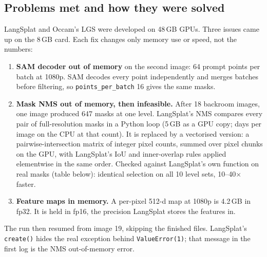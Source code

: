 \documentclass[11pt,a4paper]{article}
\newcommand{\code}[1]{\texttt{\small #1}}
\begin{document}
\subsection{Problems met and how they were solved}
LangSplat and Occam's LGS were developed on 48\,GB GPUs. Three issues came up on the 8\,GB card. Each fix changes only
memory use or speed, not the numbers:
\begin{enumerate}[leftmargin=*,itemsep=2pt]
  \item \textbf{SAM decoder out of memory} on the second image: 64 prompt points per batch at 1080p. SAM decodes every
        point independently and merges batches before filtering, so \code{points\_per\_batch} 16 gives the same masks.
  \item \textbf{Mask NMS out of memory, then infeasible.} After 18 backroom images, one image produced 647 masks at one
        level. LangSplat's NMS compares every pair of full-resolution masks in a Python loop (5\,GB as a GPU copy; days
        per image on the CPU at that count). It is replaced by a vectorised version: a pairwise-intersection matrix of
        integer pixel counts, summed over pixel chunks on the GPU, with LangSplat's IoU and inner-overlap rules applied
        elementwise in the same order. Checked against LangSplat's own function on real masks (table below): identical
        selection on all 10 level sets, 10--40$\times$ faster.
  \item \textbf{Feature maps in memory.} A per-pixel 512-d map at 1080p is 4.2\,GB in fp32. It is held in fp16, the
        precision LangSplat stores the features in.
\end{enumerate}
The run then resumed from image 19, skipping the finished files. LangSplat's \code{create()} hides the real exception
behind \code{ValueError(1)}; that message in the first log is the NMS out-of-memory error.

\begin{center}\small
{}
\end{center}
\end{document}
